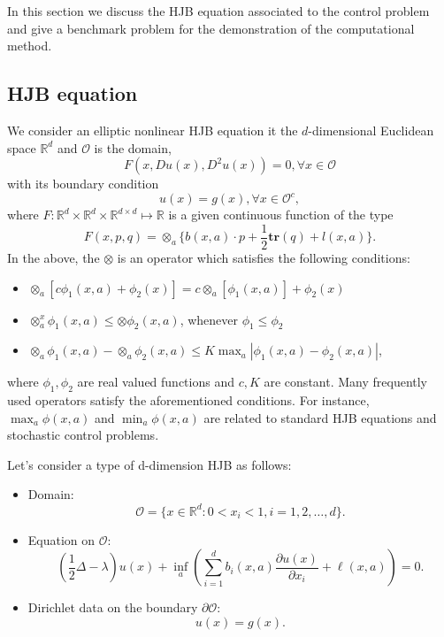 \documentclass[12pt]{article}
\begin{document}
In this section we discuss the HJB equation associated to the control problem and give a benchmark problem for the demonstration of the computational method.

\subsection{HJB equation}

We consider an elliptic nonlinear HJB equation it the $d$-dimensional Euclidean space $\mathbb{R}^{d}$ and $\mathcal{O}$ is the domain,
\begin{equation}
    F(x, Du(x), D^{2} u(x)) = 0, \forall x \in \mathcal{O}
\end{equation}
with its boundary condition
\begin{equation}
    u(x) = g(x) , \forall x \in \mathcal{O}^{c},
\end{equation}
where $F: \mathbb{R}^{d} \times \mathbb{R}^{d} \times \mathbb{R}^{d \times d} \mapsto \mathbb{R}$ is a given continuous function of the type
\begin{equation}
    F(x, p, q) = \otimes_{a} \{b(x, a) \cdot p + \frac{1}{2} \textbf{tr}(q) + l(x, a) \}.
\end{equation}
In the above, the $\otimes$ is an operator which satisfies the following conditions:
\begin{itemize}
    \item $\otimes_{a} [c \phi_{1}(x, a) + \phi_{2}(x)] = c \otimes_{a} [\phi_{1} (x, a) ] + \phi_{2}(x)$
    \item $\otimes_{a}^{x} \phi_{1}(x, a) \leq \otimes \phi_{2} (x, a)$, whenever $\phi_{1} \leq \phi_{2}$
    \item $\otimes_{a} \phi_{1} (x, a) - \otimes_{a} \phi_{2} (x, a) \leq K \max_{a} | \phi_{1}(x, a) - \phi_{2}(x, a)|$,
\end{itemize} 
where $\phi_{1}, \phi_{2}$ are real valued functions and $c, K$ are constant. Many frequently used operators satisfy the aforementioned conditions. For instance, $\max_{a} \phi(x, a)$ and $\min_{a} \phi (x, a)$ are related to standard HJB equations and stochastic control problems.

Let's consider a type of d-dimension HJB as follows:

\begin{itemize}
    \item Domain:
    $$\mathcal{O} = \{x \in \mathbb{R}^{d} : 0 < x_{i} < 1, i = 1, 2 , \dots, d\}.$$
    \item Equation on $\mathcal{O}$:
    $$(\frac{1}{2} \Delta - \lambda)u(x) + \inf_{a} (\sum_{i=1}^d b_i(x,a)\frac{\partial u(x)}{\partial x_i} + \ell (x, a)) = 0. $$
    \item Dirichlet data on the boundary $\partial \mathcal{O}$:
    $$u(x) = g(x).$$
\end{itemize}
\end{document}
